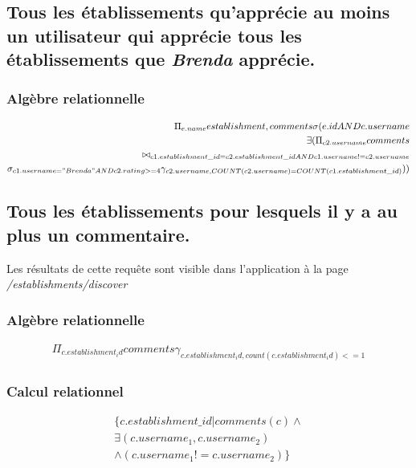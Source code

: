 \documentclass[a4paper,10pt]{article}
\begin{document}
\subsection{Tous les établissements qu'apprécie au moins un utilisateur qui
apprécie tous les établissements que \emph{Brenda} apprécie.}
    

\subsubsection{Algèbre relationnelle}
    \begin{align}
        \Pi_{e.name}establishment, comments \sigma(e.id AND c.username \\
        \exists(\Pi_{c2.username}comments \\
        \bowtie_{c1.establishment\_id=c2.establishment\_id AND c1.username!=c2.username} \\
        \sigma_{c1.username="Brenda" AND c2.rating>=4}
        \gamma_{c2.username, COUNT(c2.username)=COUNT(c1.establishment\_id)}
        ))
    \end{align}

\subsection{Tous les établissements pour lesquels il y a au plus un
commentaire.}
    Les résultats de cette requête sont visible dans l'application à la page
    \emph{/establishments/discover}
    

\subsubsection{Algèbre relationnelle}
    \begin{align}
        \Pi_{c.establishment_id}comments
        \gamma_{c.establishment_id, count(c.establishment_id)<=1}
    \end{align}

\subsubsection{Calcul relationnel}
\begin{align}
    \{ c.establishment\_id | comments(c) \wedge \\
    \exists (c.username_1, c.username_2) \\
    \wedge (c.username_1 != c.username_2) \}
\end{align}
\end{document}
